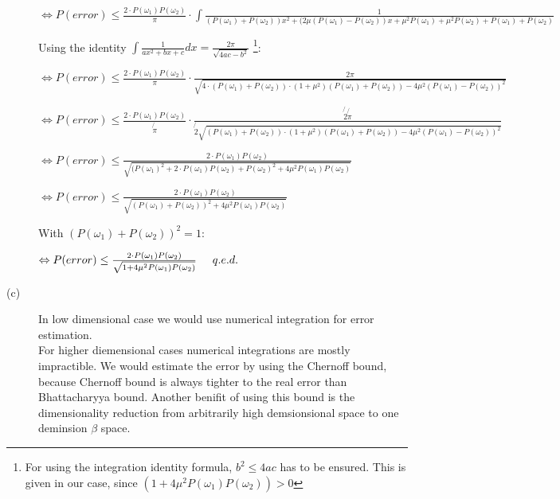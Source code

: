 \documentclass{article}
\begin{document}
\begin{description}
$\Leftrightarrow P(error) \leq \frac{2 \cdot P(\omega_1) P(\omega_2)}{\pi} \cdot \int\frac{1}{(P(\omega_1) + P(\omega_2)) x^2 + (2 \mu (P(\omega_1)-P(\omega_2))x + \mu^2 P(\omega_1) + \mu^2 P(\omega_2) + P(\omega_1) + P(\omega_2)}$ 

\vspace{0.3cm}
Using the identity $\int \frac{1}{ax^2 + bx + c} dx = \frac{2 \pi}{\sqrt{4ac-b^2}}$ \footnote[1]{For using the integration identity formula, $b^2 \leq 4ac$ has to be ensured. This is given in our case, since $(1+ 4 \mu^2 P(\omega_1) P(\omega_2)) > 0$}:
\vspace{0.3cm}

$\Leftrightarrow P(error) \leq \frac{2 \cdot P(\omega_1) P(\omega_2)}{\pi} \cdot \frac{2 \pi}{\sqrt{4 \cdot (P(\omega_1) + P(\omega_2)) \cdot (1 + \mu^2) (P(\omega_1)+P(\omega_2)) - 4 \mu^2 (P(\omega_1) - P(\omega_2))^2 }}$ 

$\Leftrightarrow P(error) \leq \frac{2 \cdot P(\omega_1) P(\omega_2)}{\not{\pi}} \cdot \frac{\not{2} \not{\pi}}{\not{2} \sqrt{(P(\omega_1) + P(\omega_2)) \cdot (1 + \mu^2) (P(\omega_1)+P(\omega_2)) - 4 \mu^2 (P(\omega_1) - P(\omega_2))^2 }}$ 

$\Leftrightarrow P(error) \leq \frac{2 \cdot P(\omega_1) P(\omega_2)}{\sqrt{(P(\omega_1)^2 + 2 \cdot P(\omega_1) P(\omega_2) + P(\omega_2)^2 + 4 \mu^2 P(\omega_1) P(\omega_2) }}$ 

$\Leftrightarrow P(error) \leq \frac{2 \cdot P(\omega_1) P(\omega_2)}{\sqrt{(P(\omega_1) + P(\omega_2))^2 + 4 \mu^2 P(\omega_1) P(\omega_2) }}$ 

\vspace{0.3cm}
With $(P(\omega_1) + P(\omega_2))^2 = 1$:
\vspace{0.3cm}

$\Leftrightarrow P(error) \leq \frac{2 \cdot P(\omega_1) P(\omega_2)}{\sqrt{1 + 4 \mu^2 P(\omega_1) P(\omega_2)}} \hspace{0.5cm} q.e.d.$ 



\item[(c)]

In low dimensional case we would use numerical integration for error estimation.\\
For higher diemensional cases numerical integrations are mostly impractible. We would estimate the error by using the Chernoff bound, because Chernoff bound is always tighter to the real error than Bhattacharyya bound. Another benifit of using this bound is the dimensionality reduction from arbitrarily high demsionsional space to one deminsion $\beta$ space.


\end{description}
\end{document}
